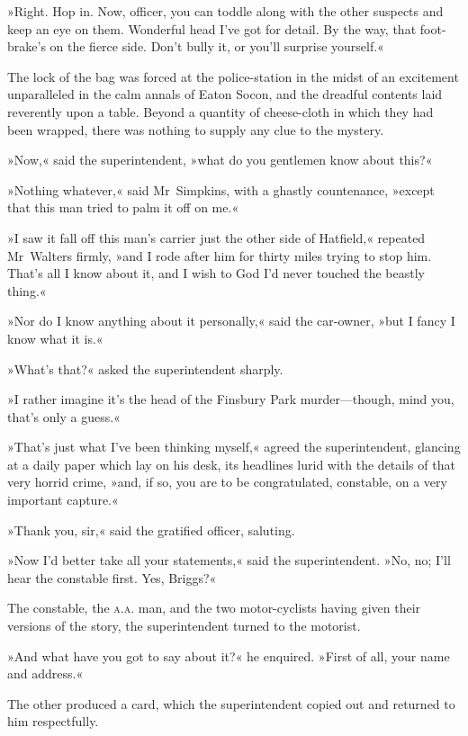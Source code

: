 »Right. Hop in. Now, officer, you can toddle along with the other suspects and keep an eye on them. Wonderful head I've got for detail. By the way, that foot-brake's on the fierce side. Don't bully it, or you'll surprise yourself.«

The lock of the bag was forced at the police-station in the midst of an excitement unparalleled in the calm annals of Eaton Socon, and the dreadful contents laid reverently upon a table. Beyond a quantity of cheese-cloth in which they had been wrapped, there was nothing to supply any clue to the mystery.

»Now,« said the superintendent, »what do you gentlemen know about this?«

»Nothing whatever,« said Mr~Simpkins, with a ghastly countenance, »except that this man tried to palm it off on me.«

»I saw it fall off this man's carrier just the other side of Hatfield,« repeated Mr~Walters firmly, »and I rode after him for thirty miles trying to stop him. That's all I know about it, and I wish to God I'd never touched the beastly thing.«

»Nor do I know anything about it personally,« said the car-owner, »but I fancy I know what it is.«

»What's that?« asked the superintendent sharply.

»I rather imagine it's the head of the Finsbury Park murder—though, mind you, that's only a guess.«

»That's just what I've been thinking myself,« agreed the superintendent, glancing at a daily paper which lay on his desk, its headlines lurid with the details of that very horrid crime, »and, if so, you are to be congratulated, constable, on a very important capture.«

»Thank you, sir,« said the gratified officer, saluting.

»Now I'd better take all your statements,« said the superintendent. »No, no; I'll hear the constable first. Yes, Briggs?«

The constable, the \textsc{a.a.} man, and the two motor-cyclists having given their versions of the story, the superintendent turned to the motorist.

»And what have you got to say about it?« he enquired. »First of all, your name and address.«

The other produced a card, which the superintendent copied out and returned to him respectfully.

